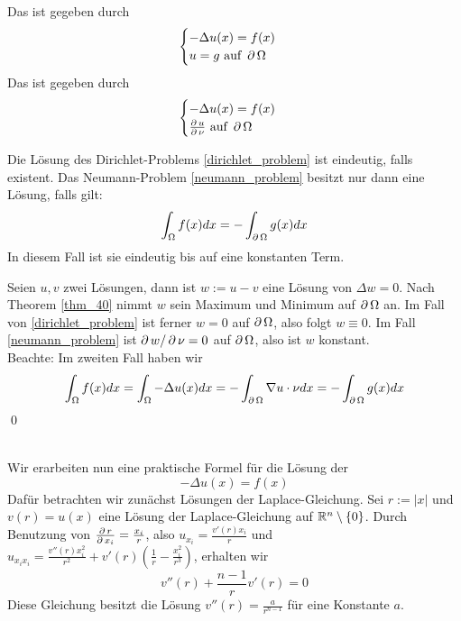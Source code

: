 \begin{defn}
\label{def:dirichlet_neumann}
	Das  ist gegeben durch 
	\begin{equation}
		\begin{cases} -\Delta u(x) = f(x) \\
		u=g \text{ auf } \operatorname{\partial} \Omega \end{cases} \label{dirichlet_problem}
	\end{equation}
	Das  ist gegeben durch
	\begin{equation}
		\begin{cases} -\Delta u(x) = f(x) \\
		\frac{\operatorname{\partial} u}{\operatorname{\partial} \nu} \text{ auf } \operatorname{\partial} \Omega \end{cases} \label{neumann_problem}
	\end{equation}
\end{defn}
	
\begin{thm} \label{thm_43}
	Die Lösung des Dirichlet-Problems \eqref{dirichlet_problem} ist eindeutig, \marginnote{[43]} falls existent. Das Neumann-Problem \eqref{neumann_problem} besitzt nur dann eine Lösung, falls gilt:
	\[ \int_\Omega f(x) dx = - \int_{\operatorname{\partial} \Omega} g(x) dx \]
	In diesem Fall ist sie eindeutig bis auf eine konstanten Term.
\end{thm}
	
	Seien $u, v$ zwei Lösungen, dann ist $w := u-v$ eine Lösung von $\Delta w = 0$. Nach Theorem \ref{thm_40} nimmt $w$ sein Maximum und Minimum auf $\operatorname{\partial} \Omega$ an. Im Fall von \eqref{dirichlet_problem} ist ferner $w = 0$ auf $\operatorname{\partial} \Omega$, also folgt $w \equiv 0$. Im Fall \eqref{neumann_problem} ist $\operatorname{\partial} w / \operatorname{\partial} \nu = 0$ auf $\operatorname{\partial} \Omega$, also ist $w$ konstant. \\
	Beachte: Im zweiten Fall haben wir
	\[ \int_{\Omega} f(x) dx = \int_\Omega - \Delta u(x) dx = -\int_{\operatorname{\partial} \Omega} \nabla u \cdot \nu dx = - \int_{\operatorname{\partial} \Omega} g(x) dx\]
	\qed
	
\mbox{} \\
Wir erarbeiten nun eine praktische Formel für die Lösung der 
\begin{equation}
	-\Delta u(x) = f(x) \label{poissongl}
\end{equation}
Dafür betrachten wir zunächst Lösungen der Laplace-Gleichung. Sei $r := |x|$ und $v(r) = u(x)$ eine Lösung der Laplace-Gleichung auf $\mathbb{R}^n \setminus \{0\}$. Durch Benutzung von $\frac{\operatorname{\partial} r}{\operatorname{\partial} x_i} = \frac{x_i}{r}$, also $u_{x_i} = \frac{v'(r) x_i}{r}$ und $u_{x_ix_i} = \frac{v''(r)x_i^2}{r^2} + v'(r) \left( \frac{1}{r}-\frac{x_i^2}{r^3} \right)$, erhalten wir
\[ v''(r) + \frac{n-1}{r} v'(r) = 0 \]
Diese Gleichung besitzt die Lösung $v''(r) = \frac{a}{r^{n-1}}$ für eine Konstante $a$.

